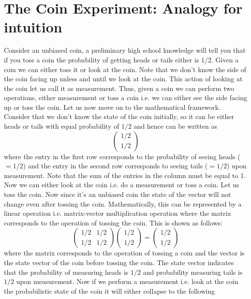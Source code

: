 \section{The Coin Experiment: Analogy for intuition}
Consider an unbiased coin, a preliminary high school knowledge will tell you that if you toss a coin the probability of getting heads or tails either is $1/2$. Given a coin we can either toss it or look at the coin. Note that we don't know the side of the coin facing up unless and until we look at the coin. This action of looking at the coin let us call it as measurement. Thus, given a coin we can perform two operations, either measurement or toss a coin i.e. we can either see the side facing up or toss the coin. Let us now move on to the mathematical framework. Consider that we don't know the state of the coin initially, so it can be either heads or tails with equal probability of $1/2$ and hence can be written as
\[
\begin{pmatrix} 1/2 \\ 1/2 \end{pmatrix}
\]
where the entry in the first row corresponds to the probability of seeing heads ($=1/2$) and the entry in the second row corresponds to seeing tails ($=1/2$) upon measurement. Note that the sum of the entries in the column must be equal to 1. Now we can either look at the coin i.e. do a measurement or toss a coin. Let us toss the coin. Now since it's an unbiased coin the state of the vector will not change even after tossing the coin. Mathematically, this can be represented by a linear operation i.e. matrix-vector multiplication operation where the matrix corresponds to the operation of tossing the coin. This is shown as follows:
\[
\begin{pmatrix} 1/2 & 1/2 \\ 1/2 & 1/2 \end{pmatrix} \begin{pmatrix} 1/2 \\ 1/2 \end{pmatrix} = \begin{pmatrix} 1/2 \\ 1/2 \end{pmatrix}
\]
where the matrix corresponds to the operation of tossing a coin and the vector is the state vector of the coin before tossing the coin. The state vector indicates that the probability of measuring heads is $1/2$ and probability measuring tails is $1/2$ upon measurement. Now if we perform a measurement i.e. look at the coin the probabilistic state of the coin it will either collapse to the following
